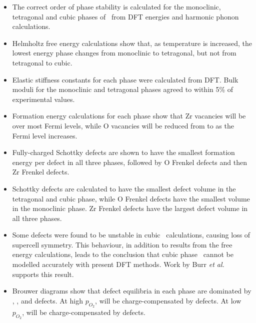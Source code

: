 \begin{itemize}
\item The correct order of phase stability is calculated for the monoclinic, tetragonal and cubic phases of \zirconia\ from DFT energies and harmonic phonon calculations. 
\item Helmholtz free energy calculations show that, as temperature is increased, the lowest energy phase changes from monoclinic to tetragonal, but not from tetragonal to cubic.
\item Elastic stiffness constants for each phase were calculated from DFT. Bulk moduli for the monoclinic and tetragonal phases agreed to within 5\% of experimental values. 
\item Formation energy calculations for each phase show that Zr vacancies will be  over most Fermi levels, while O vacancies will be reduced from  to  as the Fermi level increases.
\item Fully-charged Schottky defects are shown to have the smallest formation energy per defect in all three phases, followed by O Frenkel defects and then Zr Frenkel defects.
\item Schottky defects are calculated to have the smallest defect volume in the tetragonal and cubic phase, while O Frenkel defects have the smallest volume in the monoclinic phase. Zr Frenkel defects have the largest defect volume in all three phases.
\item Some defects were found to be unstable in cubic \zirconia\ calculations, causing loss of supercell symmetry. This behaviour, in addition to results from the free energy calculations, leads to the conclusion that cubic phase \zirconia\ cannot be modelled accurately with present DFT methods. Work by Burr \emph{et al.} \cite{burr2017importance} supports this result.
\item Brouwer diagrams show that defect equilibria in each phase are dominated by , ,  and  defects. At high $p_{O_{2}}$,  will be charge-compensated by  defects. At low $p_{O_{2}}$,  will be charge-compensated by  defects.
\end{itemize}